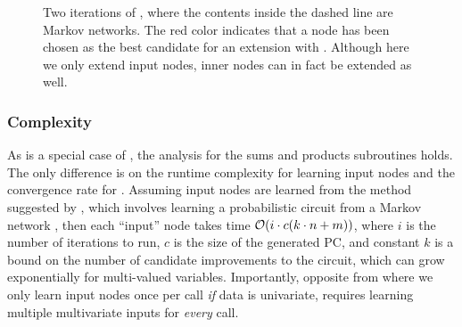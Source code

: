 \begin{figure}[t]
{
  }
  \caption{Two iterations of , where the contents inside the dashed line are
  Markov networks. The red color indicates that a node has been chosen as the best candidate for an
  extension with . Although here we only extend input nodes, inner nodes can in
  fact be extended as well.}
\end{figure}

\subsubsection{Complexity}

As  is a special case of , the analysis for the sums and
products subroutines holds. The only difference is on the runtime complexity for learning input
nodes and the convergence rate for . Assuming input nodes are learned from the
method suggested by \citet{rooshenas14}, which involves learning a probabilistic circuit from a
Markov network \citep{lowd13a}, then each ``input'' node takes time $\mathcal{O}(i\cdot c(k\cdot n+m))$,
where $i$ is the number of iterations to run, $c$ is the size of the generated PC, and constant $k$
is a bound on the number of candidate improvements to the circuit, which can grow exponentially for
multi-valued variables. Importantly, opposite from  where we only learn input
nodes once per call \emph{if} data is univariate,  requires learning multiple
multivariate inputs for \emph{every}  call.

